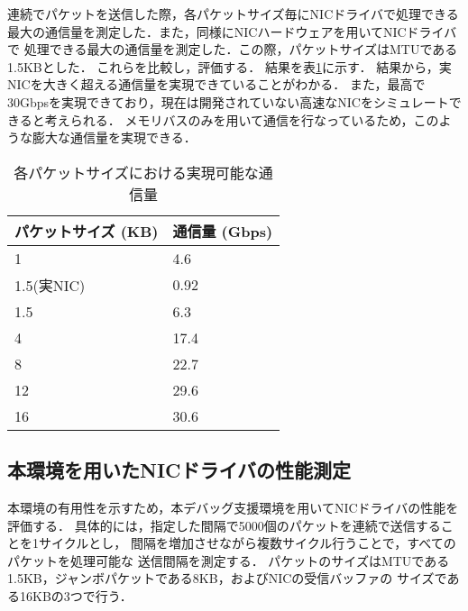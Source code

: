 \documentclass[submit,techreq,noauthor,dvipdfmx]{ipsj}
\begin{document}
連続でパケットを送信した際，各パケットサイズ毎にNICドライバで処理できる
最大の通信量を測定した．また，同様にNICハードウェアを用いてNICドライバで
処理できる最大の通信量を測定した．この際，パケットサイズはMTUである1.5KBとした．
これらを比較し，評価する．
結果を表\ref{throughput-nic}に示す．
結果から，実NICを大きく超える通信量を実現できていることがわかる．
また，最高で30Gbpsを実現できており，現在は開発されていない高速なNICをシミュレートできると考えられる．
メモリバスのみを用いて通信を行なっているため，このような膨大な通信量を実現できる．

\begin{table}[h]
    \caption{各パケットサイズにおける実現可能な通信量}
    \label{throughput-nic}
    \begin{center}
        \begin{tabular}{l|l}   \hline \hline 
            パケットサイズ (KB)      & 通信量 (Gbps)  \\ \hline
            1                        & 4.6            \\
            1.5(実NIC)               & 0.92           \\
            1.5                      & 6.3            \\
            4                        & 17.4           \\
            8                        & 22.7           \\
            12                       & 29.6           \\
            16                       & 30.6           \\ \hline
        \end{tabular}
    \end{center}
\end{table}

\subsection{本環境を用いたNICドライバの性能測定}\label{sec:interval}

本環境の有用性を示すため，本デバッグ支援環境を用いてNICドライバの性能を
評価する．
具体的には，指定した間隔で5000個のパケットを連続で送信することを1サイクルとし，
間隔を増加させながら複数サイクル行うことで，すべてのパケットを処理可能な
送信間隔を測定する．
パケットのサイズはMTUである1.5KB，ジャンボパケットである8KB，およびNICの受信バッファの
サイズである16KBの3つで行う．
\end{document}
